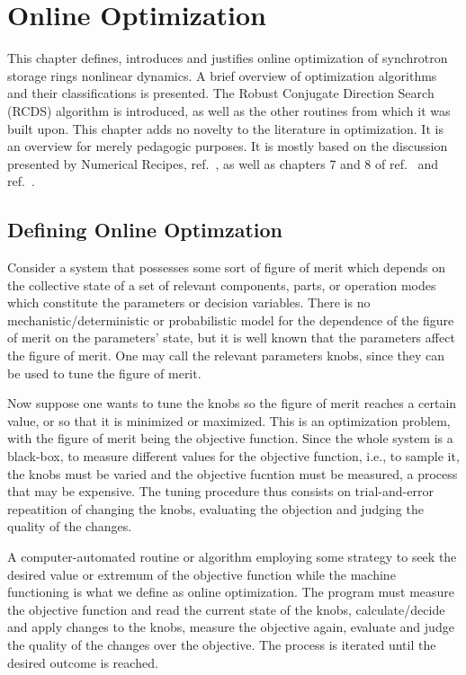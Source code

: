 \chapter{Online Optimization}
This chapter defines, introduces and justifies online optimization  of synchrotron storage rings nonlinear dynamics. A brief overview of optimization algorithms and their classifications is presented. The Robust Conjugate Direction Search (RCDS) algorithm is introduced, as well as the other routines from which it was built upon. This chapter adds no novelty to the literature in optimization. It is an overview for merely pedagogic purposes. It is mostly based on the discussion presented by Numerical Recipes, ref.~\cite{press_numerical_2007}, as well as chapters 7 and 8 of ref.~\cite[]{huang_beam-based_2019} and ref.~\cite{huang_algorithm_2013}.
\section{Defining Online Optimzation}
Consider a system that possesses some sort of figure of merit which depends on the collective state of a set of relevant components, parts, or operation modes which constitute the  parameters or decision variables. There is no mechanistic/deterministic or probabilistic model for the dependence of the figure of merit on the parameters' state, but it is well known that the parameters affect the figure of merit. One may call the relevant parameters knobs, since they can be used to tune the figure of merit.

Now suppose one wants to tune the knobs so the figure of merit reaches a certain value, or so that it is minimized or maximized. This is an optimization problem, with the figure of merit being the objective function. Since the whole system is a black-box, to measure different values for the objective function, i.e., to sample it, the knobs must be varied and the objective fucntion must be measured, a process that may be expensive. The tuning procedure thus consists on trial-and-error repeatition of changing the knobs, evaluating the objection and judging the quality of the changes.

A computer-automated routine or algorithm employing some strategy to seek the desired value or extremum of the objective function while the machine functioning is what we define as online optimization. The program must measure the objective function and read the current state of the knobs, calculate/decide and apply changes to the knobs, measure the objective again, evaluate and judge the quality of the changes over the objective. The process is iterated until the desired outcome is reached.

